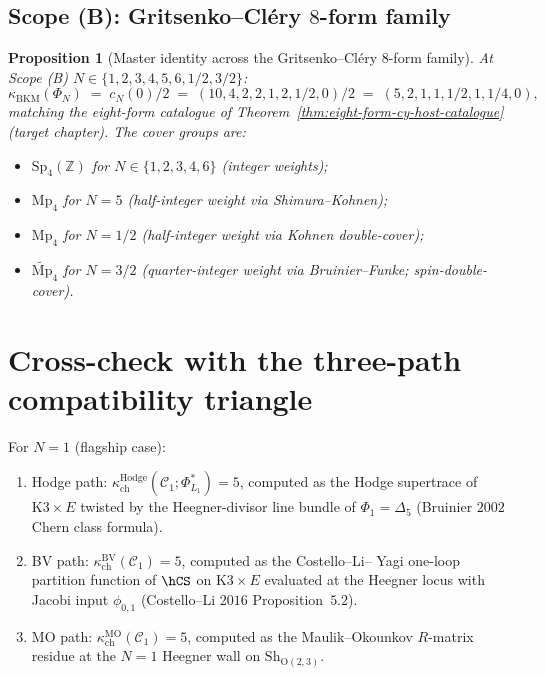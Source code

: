 \documentclass[11pt]{amsart}
\newtheorem{proposition}[theorem]{Proposition}
\providecommand{\Z}{\mathbb{Z}}
\providecommand{\cC}{\mathcal{C}}
\providecommand{\Sp}{\mathrm{Sp}}
\providecommand{\Mp}{\mathrm{Mp}}
\providecommand{\BV}{\mathrm{BV}}
\providecommand{\MO}{\mathrm{MO}}
\providecommand{\Hodge}{\mathrm{Hodge}}
\providecommand{\kBKM}{\kappa_{\mathrm{BKM}}}
\providecommand{\kch}{\kappa_{\mathrm{ch}}}
\begin{document}
\subsection{Scope (B): Gritsenko--Cl\'ery $8$-form family}

\begin{proposition}[Master identity across the
Gritsenko--Cl\'ery $8$-form family]
\label{prop:master-gc-8form}
At Scope (B) $N \in \{1, 2, 3, 4, 5, 6, 1/2, 3/2\}$:
\[
 \kBKM(\Phi_N) \;=\; c_N(0)/2
 \;=\; (10, 4, 2, 2, 1, 2, 1/2, 0) / 2
 \;=\; (5, 2, 1, 1, 1/2, 1, 1/4, 0),
\]
matching the eight-form catalogue of
Theorem~\ref{thm:eight-form-cy-host-catalogue} (target chapter).
The cover groups are:
\begin{itemize}
\item $\Sp_4(\Z)$ for $N \in \{1, 2, 3, 4, 6\}$ (integer weights);
\item $\Mp_4$ for $N = 5$ (half-integer weight via Shimura--Kohnen);
\item $\Mp_4$ for $N = 1/2$ (half-integer weight via Kohnen
double-cover);
\item $\widetilde{\Mp}_4$ for $N = 3/2$ (quarter-integer weight via
Bruinier--Funke; spin-double-cover).
\end{itemize}
\end{proposition}

\section{Cross-check with the three-path compatibility triangle}
\label{sec:three-path-cross-check}

For $N = 1$ (flagship case):
\begin{enumerate}[label=\textup{(\roman*)}]
\item Hodge path: $\kch^{\Hodge}(\cC_1; \Phi^*_{L_1}) = 5$,
computed as the Hodge supertrace of $\mathrm{K3} \times E$ twisted by
the Heegner-divisor line bundle of $\Phi_1 = \Delta_5$ (Bruinier
$2002$ Chern class formula).
\item BV path: $\kch^{\BV}(\cC_1) = 5$, computed as the Costello--Li--
Yagi one-loop partition function of $\hCS$ on $\mathrm{K3} \times E$
evaluated at the Heegner locus with Jacobi input $\phi_{0, 1}$
(Costello--Li $2016$ Proposition~$5.2$).
\item MO path: $\kch^{\MO}(\cC_1) = 5$, computed as the
Maulik--Okounkov $R$-matrix residue at the $N = 1$ Heegner wall on
$\mathrm{Sh}_{\mathrm{O}(2, 3)}$.
\end{enumerate}
\end{document}
